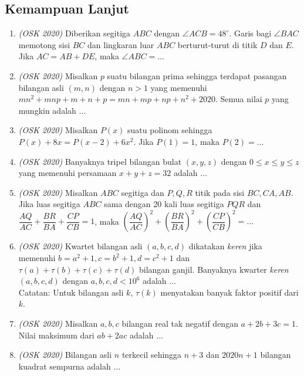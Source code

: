 \documentclass[11pt]{scrartcl}
\begin{document}
\subsection{Kemampuan Lanjut}
\begin{enumerate}
    \item \textit{(OSK 2020)} Diberikan segitiga $ABC$ dengan $\angle ACB = 48^\circ$. Garis bagi $\angle BAC$ memotong sisi $BC$ dan lingkaran luar $ABC$ berturut-turut di titik $D$ dan $E$. Jika  $AC = AB+DE$, maka $\angle ABC = \dots$
    
    \item \textit{(OSK 2020)} Misalkan $p$ suatu bilangan prima sehingga terdapat pasangan bilangan asli $(m,n)$ dengan  $n > 1$ yang memenuhi $mn^2+mnp+m+n+p = mn+mp+np+n^2+2020$. Semua nilai $p$ yang mungkin adalah $\dots$

    \item \textit{(OSK 2020)} Misalkan $P(x)$ suatu polinom sehingga $P(x)+8x=P(x-2)+6x^2$. Jika $P(1)=1$, maka $P(2)=\dots$
    
    \item \textit{(OSK 2020)} Banyaknya tripel bilangan bulat $(x,y,z)$ dengan $0 \leq x \leq y \leq z$ yang memenuhi persamaan $x+y+z = 32$ adalah $\dots$
    
    \item \textit{(OSK 2020)} Misalkan $ABC$ segitiga dan $P,Q,R$ titik pada sisi $BC,CA,AB$. Jika luas segitiga $ABC$ sama dengan 20 kali luas segitiga $PQR$ dan $\dfrac{AQ}{AC}+\dfrac{BR}{BA}+\dfrac{CP}{CB} = 1$, maka $\left(\dfrac{AQ}{AC}\right)^2+\left(\dfrac{BR}{BA}\right)^2+\left(\dfrac{CP}{CB}\right)^2 = \dots$
    
    \item \textit{(OSK 2020)} Kwartet bilangan asli $(a,b,c,d)$ dikatakan \textit{keren} jika memenuhi $b = a^2+1,c = b^2+1,d = c^2+1$ dan $\tau(a)+\tau(b)+\tau(c)+\tau(d)$ bilangan ganjil. Banyaknya kwarter \textit{keren} $(a,b,c,d)$ dengan $a,b,c,d < 10^6$ adalah $\dots$
    \\
    Catatan: Untuk bilangan asli $k$, $\tau(k)$ menyatakan banyak faktor positif dari $k$.
    
    \item \textit{(OSK 2020)} Misalkan $a,b,c$ bilangan real tak negatif dengan $a+2b+3c = 1$. Nilai maksimum dari $ab+2ac$ adalah $\dots$
    
    \item \textit{(OSK 2020)} Bilangan asli $n$ terkecil sehingga  $n+3$ dan $2020n+1$ bilangan kuadrat sempurna adalah $\dots$
    

\end{enumerate}
\end{document}
